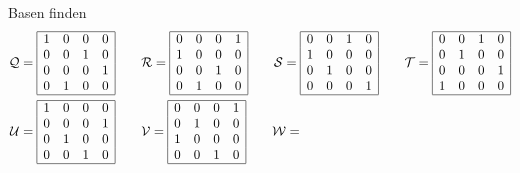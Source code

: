 \documentclass{uebungszettel}
\begin{document}
\begin{aufgabe}{Basen finden}
	 \begin{align*}
	 \mathcal{Q} = 
	 	\begin{array}{|cccc|}
	 		\hline
			 1 & 0 & 0 & 0 \\ 
			 0 & 0 & 1 & 0 \\ 
			 0 & 0 & 0 & 1 \\ 
			 0 & 1 & 0 & 0 \\
	 		\hline
	 	\end{array} 
	 \qquad
	 &\mathcal{R} = 
		 \begin{array}{|cccc|}
		 	\hline
			 0 & 0 & 0 & 1 \\ 
			 1 & 0 & 0 & 0 \\ 
			 0 & 0 & 1 & 0 \\ 
			 0 & 1 & 0 & 0 \\
		 	\hline
		 \end{array} 
	\qquad
	\mathcal{S} = 
		\begin{array}{|cccc|}
		\hline
			0 & 0 & 1 & 0 \\ 
			1 & 0 & 0 & 0 \\ 
			0 & 1 & 0 & 0 \\ 
			0 & 0 & 0 & 1 \\
		\hline
		\end{array}
	\qquad
	\mathcal{T} = 
		\begin{array}{|cccc|}
		\hline
			0 & 0 & 1 & 0 \\ 
			0 & 1 & 0 & 0 \\ 
			0 & 0 & 0 & 1 \\ 
			1 & 0 & 0 & 0 \\
		\hline
		\end{array} 
		\\
	\mathcal{U} = 
		\begin{array}{|cccc|}
		\hline
			1 & 0 & 0 & 0 \\ 
			0 & 0 & 0 & 1 \\ 
			0 & 1 & 0 & 0 \\ 
			0 & 0 & 1 & 0 \\
		\hline
		\end{array} 
	\qquad
	&\mathcal{V} = 
		\begin{array}{|cccc|}
		\hline
			0 & 0 & 0 & 1 \\ 
			0 & 1 & 0 & 0 \\ 
			1 & 0 & 0 & 0 \\ 
			0 & 0 & 1 & 0 \\
		\hline
		\end{array}
	\qquad
	\mathcal{W} = 
		\begin{array}{|cccc|}

\end{array}
\end{align*}
\end{aufgabe}
\end{document}
